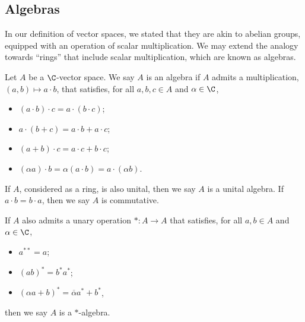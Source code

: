 \subsection{Algebras}%
In our definition of vector spaces, we stated that they are akin to abelian groups, equipped with an operation of scalar multiplication. We may extend the analogy towards ``rings'' that include scalar multiplication, which are known as algebras.
\begin{definition}
  Let $A$ be a $\C$-vector space. We say $A$ is an algebra if $A$ admits a multiplication, $\left(a,b\right)\mapsto a\cdot b$, that satisfies, for all $a,b,c\in A$ and $\alpha \in \C$,
  \begin{itemize}
    \item $\left(a\cdot b\right)\cdot c = a\cdot \left(b\cdot c\right)$;
    \item $a\cdot \left(b+c\right) = a\cdot b + a\cdot c$;
    \item $\left(a+b\right)\cdot c = a\cdot c + b\cdot c$;
    \item $\left(\alpha a\right)\cdot b = \alpha \left(a\cdot b\right) = a \cdot \left(\alpha b\right)$.
  \end{itemize}
  If $A$, considered as a ring, is also unital, then we say $A$ is a unital algebra. If $a\cdot b = b\cdot a$, then we say $A$ is commutative.\newline

  If $A$ also admits a unary operation $\ast\colon A\rightarrow A$ that satisfies, for all $a,b\in A$ and $\alpha \in \C$,
  \begin{itemize}
    \item $a^{\ast\ast} = a$;
    \item $\left(ab\right)^{\ast} = b^{\ast}a^{\ast}$;
    \item $\left(\alpha a + b\right)^{\ast} = \overline{\alpha}a^{\ast} + b^{\ast}$,
  \end{itemize}
  then we say $A$ is a $\ast$-algebra.
\end{definition}

